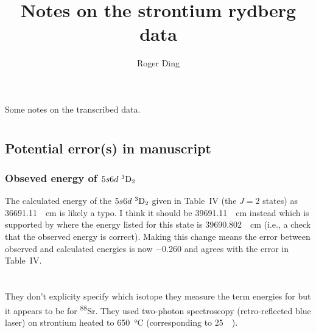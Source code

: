 \documentclass{article}
\title{Notes on the strontium rydberg data}
\author{Roger Ding}
\newcommand{\tsup}{\textsuperscript}													%
\newcommand{\tsub}{\textsubscript}														%
\newcommand{\Sr}[1]{\tsup{#1}\textnormal{Sr}}											%
\newcommand{\SLJ}[3]{\tsup{#1}\textnormal{#2}\tsub{#3}}
\newcommand{\nSLJ}[4]{{#1}\textnormal{ }\SLJ{#2}{#3}{#4}}
\begin{document}
\maketitle


Some notes on the transcribed data.

\section{}

\subsection{Potential error(s) in manuscript}

\subsubsection{Obseved energy of $\nSLJ{5s6d}{3}{D}{2}$}

The calculated energy of the $\nSLJ{5s6d}{3}{D}{2}$ given in Table~IV (the ${J=2}$ states) as \SI{36691.11}{\per\cm} is likely a typo. I think it should be \SI{39691.11}{\per\cm} instead which is supported by \cite{san_2010} where the energy listed for this state is \SI{39690.802}{\per\cm} (i.e., a check that the observed energy is correct). Making this change means the error between observed and calculated energies is now \num{-0.260} and agrees with the error in Table~IV.

\section{}

They don't explicity specify which isotope they measure the term energies for but it appears to be for \Sr{88}. They used two-photon spectroscopy (retro-reflected blue laser) on strontium heated to \SI{650}{\celsius} (corresponding to \SI{25}{\milli\Torr}). 

\section{}

\section{}

\section{}

\section{}
 
\printbibliography
\end{document}
